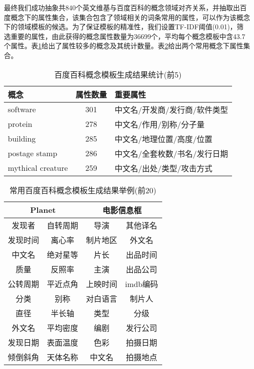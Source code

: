 最终我们成功抽象共840个英文维基与百度百科的概念领域对齐关系，并抽取出百度概念下的属性集合，该集合包含了领域相关的词条常用的属性，可以作为该概念下的领域模板的候选。为了保证模板的精准性，我们设置TF-IDF阈值(0.01)，筛选重要的属性，由此获得的概念属性数量为36699个，平均每个概念模板中含43.7个属性。表\ref{tab:baidu-template-stat}给出了属性较多的概念及其统计数量。表\ref{tab:baidu-template-examples}给出两个常用概念下属性集合。

\begin{table}[htb]
  \centering
  \caption{百度百科概念模板生成结果统计(前5)}
  \label{tab:baidu-template-stat}
    \begin{tabular}{lcl}
      \toprule[1.5pt]
         概念 & 属性数量 & 重要属性\\ \midrule[1pt]
         software      & 301  &  中文名/开发商/发行商/软件类型\\
         protein       & 278  & 中文名/作用/别称/分子量       \\
         building      & 285  & 中文名/地理位置/高度/位置     \\
         postage stamp & 286  & 中文名/全套枚数/书名/发行日期 \\
         mythical creature  & 259 & 中文名/出处/类型/攻击方式 \\
      \bottomrule[1.5pt]
    \end{tabular}
\end{table}

\begin{table}[htb]
  \centering
  \caption{常用百度百科概念模板生成结果举例(前20)}
  \label{tab:baidu-template-examples}
    \begin{tabular}{cccc}
      \toprule[1.5pt]
         \multicolumn{2}{c}{Planet} & \multicolumn{2}{c}{电影信息框}\\ \midrule[1pt]
         发现者   &  自转周期  & 导演     & 其他译名 \\
         发现时间 &  离心率    & 制片地区 & 外文名   \\
         中文名   &  绝对星等  & 片长     & 出品时间 \\
         质量     &  反照率    & 主演     & 出品公司 \\
         公转周期 &  平近点角  & 上映时间 & imdb编码 \\
         分类     &  别称      & 对白语言 & 制片人   \\
         直径     &  半长轴    & 类型     & 分级     \\
         外文名   &  平均密度  & 编剧     & 发行公司 \\
         发现日期 &  表面温度  & 色彩     & 拍摄日期 \\
         倾倒斜角 &  天体名称  & 中文名   & 拍摄地点 \\
      \bottomrule[1.5pt]
    \end{tabular}
\end{table}

